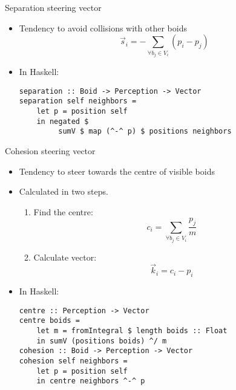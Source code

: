 \documentclass{beamer}
\begin{document}
\begin{frame}[fragile]
    \huge{Separation steering vector}\normalsize
    \begin{itemize}

    \item Tendency to avoid collisions with other boids
        \begin{equation*}
    \vec{s}_i = - \sum\limits_{\forall b_j \in V_i} (p_i - p_j)
    \end{equation*}
    \item<2-> In Haskell:
    \begin{verbatim}
separation :: Boid -> Perception -> Vector
separation self neighbors =
    let p = position self
    in negated $
         sumV $ map (^-^ p) $ positions neighbors
\end{verbatim}
    \end{itemize}


\end{frame}

\begin{frame}[fragile]
\huge{Cohesion steering vector}\normalsize
    \begin{itemize}
        \item Tendency to steer towards the centre of visible boids
        \item Calculated in two steps.
        \begin{enumerate}
        \item<2-> Find the centre:
            \begin{equation}
            c_i = \sum\limits_{\forall b_j \in V_i} \frac{p_j}{m}
            \end{equation}
        \item<3-> Calculate vector:
            \begin{equation*}
            \vec{k}_i = c_i - p_i
            \end{equation*}
        \end{enumerate}
        \item<4-> In Haskell:
        \begin{verbatim}
centre :: Perception -> Vector
centre boids =
    let m = fromIntegral $ length boids :: Float
    in sumV (positions boids) ^/ m
cohesion :: Boid -> Perception -> Vector
cohesion self neighbors =
    let p = position self
    in centre neighbors ^-^ p
        \end{verbatim}

    \end{itemize}


\end{frame}
\end{document}
